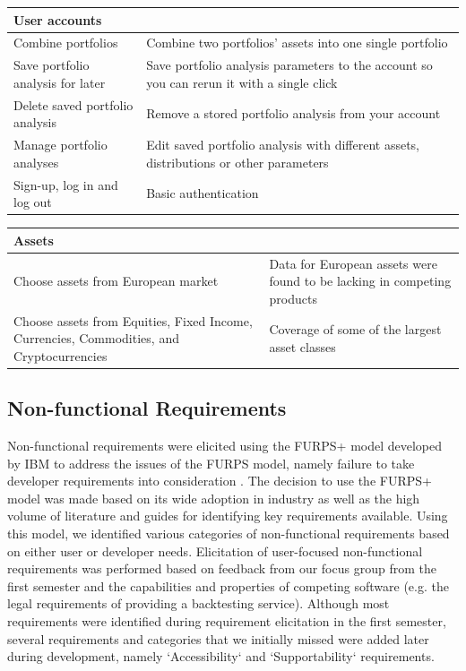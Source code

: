 \documentclass[main.tex]{subfiles}
\begin{document}
{
\setlength{\tabcolsep}{30pt}
\renewcommand{\arraystretch}{2}
\centering
{}
\begin{tabularx}{\linewidth}{|X|X|}
\hline
 \textbf{User accounts}  &  \\
 \hline
 Combine portfolios & Combine two portfolios' assets into one single portfolio \\
\hline
Save portfolio analysis for later & Save portfolio analysis parameters to the account so you can rerun it with a single click \\
\hline
Delete saved portfolio analysis & Remove a stored portfolio analysis from your account \\
\hline
Manage portfolio analyses & Edit saved portfolio analysis with different assets, distributions or other parameters \\
\hline
Sign-up, log in and log out & Basic authentication \\
\hline
\end{tabularx}
}

\vspace{0.5cm}

{
\setlength{\tabcolsep}{30pt}
\renewcommand{\arraystretch}{2}
\centering
{}
\begin{tabularx}{\linewidth}{|X|X|}
\hline
 \textbf{Assets}  &  \\
 \hline
 Choose assets from European market & Data for European assets were found to be lacking in competing products \\
\hline
Choose assets from Equities, Fixed Income, Currencies, Commodities, and Cryptocurrencies & Coverage of some of the largest asset classes \\
\hline
\end{tabularx}
}

\subsection{Non-functional Requirements}
Non-functional requirements were elicited using the FURPS+ model developed by IBM to address the issues of the FURPS model, namely failure to take developer requirements into consideration \cite{FURPS_drawbacks}. The decision to use the FURPS+ model was made based on its wide adoption in industry as well as the high volume of literature and guides for identifying key requirements available. Using this model, we identified various categories of non-functional requirements based on either user or developer needs. Elicitation of user-focused non-functional requirements was performed based on feedback from our focus group from the first semester and the capabilities and properties of competing software (e.g. the legal requirements of providing a backtesting service). Although most requirements were identified during requirement elicitation in the first semester, several requirements and categories that we initially missed were added later during development, namely `Accessibility` and `Supportability` requirements.
\end{document}
